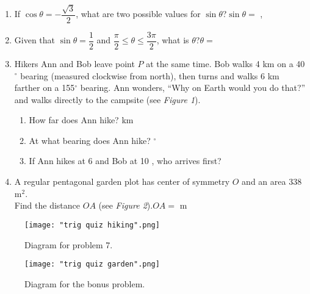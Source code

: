 \documentclass{article}
\begin{document}
\begin{enumerate}
\item If $\cos\theta = -\dfrac{\sqrt{3}}{2}$, what are two possible values for $\sin\theta$?\hfill$\sin\theta =$ \underline{\hspace{1cm}} , \underline{\hspace{1cm}}
\item Given that $\sin\theta = \dfrac{1}{2}$ and $\dfrac{\pi}{2}\leqslant\theta\leqslant\dfrac{3\pi}{2}$, what is $\theta$?\hfill$\theta =$ \underline{\hspace{1cm}}
\item Hikers Ann and Bob leave point $P$ at the same time. Bob walks 4 km on a 40$^\circ$ bearing (measured clockwise from north), then turns and walks 6 km farther on a 155$^\circ$ bearing. Ann wonders, ``Why on Earth would you do that?'' and walks directly to the campsite (see \textit{Figure 1}).
	\begin{enumerate}
	\item How far does Ann hike?\hfill \underline{\hspace{1cm}} km\phantom{$^\circ$}
	\item At what bearing does Ann hike?\hfill \underline{\hspace{1cm}} $^\circ$\phantom{km}
	\item If Ann hikes at 6  and Bob at 10 , who arrives first?\hfill \underline{\hspace{1cm}} \phantom{$^\circ$km}
	\end{enumerate}
\item A regular pentagonal garden plot has center of symmetry $O$ and an area 338 m$^2$.\\Find the distance $OA$ (see \textit{Figure 2}).\hfill$OA =$ \underline{\hspace{1cm}} m
\end{enumerate}

\begin{figure}[H]
	\centering
    \begin{minipage}[b]{0.49\textwidth}
    	\centering
    	\texttt{[image: "trig quiz hiking".png]}
		\caption{Diagram for problem 7.}
    \end{minipage}
    \hfill
    \begin{minipage}[b]{0.49\textwidth}
    	\centering
    	\texttt{[image: "trig quiz garden".png]}
		\caption{Diagram for the bonus problem.}
    \end{minipage}
\end{figure}
\end{document}
